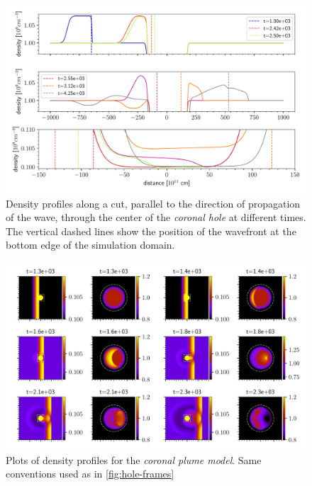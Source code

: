 \begin{figure}[H]
	\centering
	\includegraphics[width=\linewidth]{images/hole-sections.pdf}
	\caption{Density profiles along a cut, parallel to the direction of propagation of the wave, through the center of the \emph{coronal hole} at different times. The vertical dashed lines show the position of the wavefront at the bottom edge of the simulation domain.}
	\label{fig:hole-sections}
\end{figure}


\begin{figure}[H]
	\centering
	\includegraphics[width=\linewidth]{images/plume-frames.pdf}
	\caption{Plots of density profiles for the \emph{coronal plume model}. Same conventions used as in \cref{fig:hole-frames}}
	\label{fig:plume-frames}
\end{figure}

